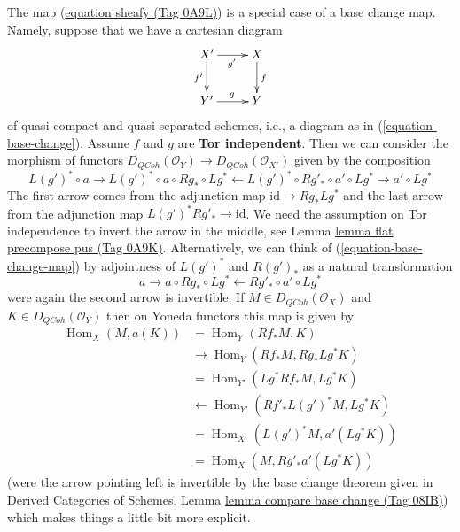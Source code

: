 \documentclass{amsart}
\theoremstyle{plain}
\theoremstyle{definition}
\theoremstyle{remark}
\numberwithin{equation}{subsection}
\def\Hom{\mathop{\mathrm{Hom}}\nolimits}
\def\QCoh{\mathit{QCoh}}
\begin{document}
\noindent
The map (\href{https://stacks.math.columbia.edu/tag/0A9L}{equation sheafy (Tag 0A9L)}) is a special case of a base change map.
Namely, suppose that we have a cartesian diagram
$$
\xymatrix{
X' \ar[r]_{g'} \ar[d]_{f'} & X \ar[d]^f \\
Y' \ar[r]^g & Y
}
$$
of quasi-compact and quasi-separated schemes, i.e., a diagram as in
(\ref{equation-base-change}). Assume $f$ and $g$ are {\bf Tor independent}.
Then we can consider the morphism of functors
$D_\QCoh(\mathcal{O}_Y) \to D_\QCoh(\mathcal{O}_{X'})$
given by the composition
\begin{equation}
\label{equation-base-change-map}
L(g')^* \circ a \to
L(g')^* \circ a \circ Rg_* \circ Lg^* \leftarrow
L(g')^* \circ Rg'_* \circ a' \circ Lg^* \to a' \circ Lg^*
\end{equation}
The first arrow comes from the adjunction map $\text{id} \to Rg_* Lg^*$
and the last arrow from the adjunction map $L(g')^*Rg'_* \to \text{id}$.
We need the assumption on Tor independence to invert the arrow
in the middle, see Lemma \href{https://stacks.math.columbia.edu/tag/0A9K}{lemma flat precompose pus (Tag 0A9K)}.
Alternatively, we can think of (\ref{equation-base-change-map}) by
adjointness of $L(g')^*$ and $R(g')_*$ as a natural transformation
$$
a \to a \circ Rg_* \circ Lg^* \leftarrow Rg'_* \circ a' \circ Lg^*
$$
were again the second arrow is invertible. If $M \in D_\QCoh(\mathcal{O}_X)$
and $K \in D_\QCoh(\mathcal{O}_Y)$
then on Yoneda functors this map is given by
\begin{align*}
\Hom_X(M, a(K))
& =
\Hom_Y(Rf_*M, K) \\
& \to
\Hom_Y(Rf_*M, Rg_* Lg^*K) \\
& =
\Hom_{Y'}(Lg^*Rf_*M, Lg^*K) \\
& \leftarrow
\Hom_{Y'}(Rf'_* L(g')^*M, Lg^*K) \\
& =
\Hom_{X'}(L(g')^*M, a'(Lg^*K)) \\
& =
\Hom_X(M, Rg'_*a'(Lg^*K))
\end{align*}
(were the arrow pointing left is invertible by the base
change theorem given in
Derived Categories of Schemes, Lemma \href{https://stacks.math.columbia.edu/tag/08IB}{lemma compare base change (Tag 08IB)})
which makes things a little bit more explicit.
\end{document}
